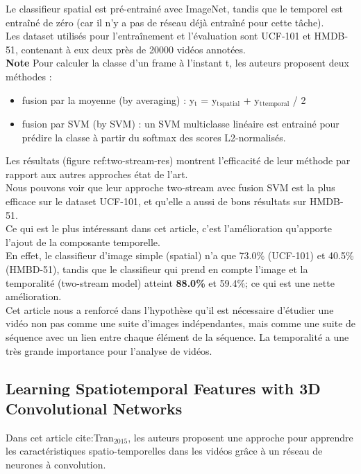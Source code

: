\documentclass[11pt]{article}
\begin{document}
Le classifieur spatial est pré-entrainé avec ImageNet, tandis que le temporel est entraîné de zéro (car il n'y a pas de réseau déjà entraîné pour cette tâche).\\
Les dataset utilisés pour l'entraînement et l'évaluation sont UCF-101 et HMDB-51, contenant à eux deux près de 20000 vidéos annotées.\\

\textbf{Note} Pour calculer la classe d'un frame à l'instant t, les auteurs proposent deux méthodes :\\
\begin{itemize}
\item fusion par la moyenne (by averaging) : y\(_{\text{t}}\) = y\(_{\text{t}}\)\(_{\text{spatial}}\) + y\(_{\text{t}}\)\(_{\text{temporal}}\) / 2\\
\item fusion par SVM (by SVM) : un SVM multiclasse linéaire est entrainé pour prédire la classe à partir du softmax des scores L2-normalisés.\\
\end{itemize}

Les résultats (figure ref:two-stream-res) montrent l'efficacité de leur méthode par rapport aux autres approches état de l'art.\\

Nous pouvons voir que leur approche two-stream avec fusion SVM est la plus efficace sur le dataset UCF-101, et qu'elle a aussi de bons résultats sur HMDB-51.\\

Ce qui est le plus intéressant dans cet article, c'est l'amélioration qu'apporte l'ajout de la composante temporelle.\\
En effet, le classifieur d'image simple (spatial) n'a que 73.0\% (UCF-101) et 40.5\% (HMBD-51), tandis que le classifieur qui prend en compte l'image et la temporalité (two-stream model) atteint \textbf{88.0\%} et 59.4\%; ce qui est une nette amélioration.\\

Cet article nous a renforcé dans l'hypothèse qu'il est nécessaire d'étudier une vidéo non pas comme une suite d'images indépendantes, mais comme une suite de séquence avec un lien entre chaque élément de la séquence. La temporalité a une très grande importance pour l'analyse de vidéos.\\

\subsection{Learning Spatiotemporal Features with 3D Convolutional Networks}
\label{sec:org0abede3}
Dans cet article cite:Tran\(_{\text{2015}}\), les auteurs proposent une approche pour apprendre les caractéristiques spatio-temporelles dans les vidéos grâce à un réseau de neurones à convolution.\\
\end{document}
